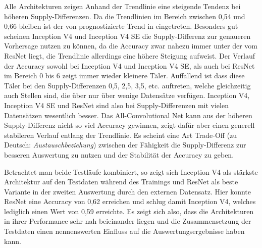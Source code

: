 Alle Architekturen zeigen Anhand der Trendlinie eine steigende Tendenz bei höheren Supply-Differenzen. Da die Trendlinien im Bereich zwischen 0,54 und 0,66 bleiben ist der von \textcite{AIIDE137381} prognostizierte Trend in eingetreten. Besonders gut scheinen Inception V4 und Inception V4 SE die Supply-Differenz zur genaueren Vorhersage nutzen zu können, da die Accuracy zwar nahezu immer unter der vom ResNet liegt, die Trendlinie allerdings eine höhere Steigung aufweist. Der Verlauf der Accuracy sowohl bei Inception V4 und Inception V4 SE, als auch bei ResNet im Bereich 0 bis 6 zeigt immer wieder kleinere Täler. Auffallend ist dass diese Täler bei den Supply-Differenzen 0,5, 2,5, 3,5, etc. auftreten, welche gleichzeitig auch Stellen sind, die über nur über wenige Datensätze verfügen. Inception V4, Inception V4 SE und ResNet sind also bei Supply-Differenzen mit vielen Datensätzen wesentlich besser. Das All-Convolutional Net kann aus der höheren Supply-Differenz nicht so viel Accuracy gewinnen, zeigt dafür aber einen generell stabileren Verlauf entlang der Trendlinie. Es scheint eine Art Trade-Off (zu Deutsch: \textit{Austauschbeziehung}) zwischen der Fähigkeit die Supply-Differenz zur besseren Auswertung zu nutzen und der Stabilität der Accuracy zu geben. 

Betrachtet man beide Testläufe kombiniert, so zeigt sich Inception V4 als stärkste Architektur auf den Testdaten während des Trainings und ResNet als beste Variante in der zweiten Auswertung durch den externen Datensatz. Hier konnte ResNet eine Accuracy von 0,62 erreichen und schlug damit Inception V4, welches lediglich einen Wert von 0,59 erreichte. Es zeigt sich also, dass die Architekturen in ihrer Performance sehr nah beieinander liegen und die Zusammensetzung der Testdaten einen nennenswerten Einfluss auf die Auswertungsergebnisse haben kann.
